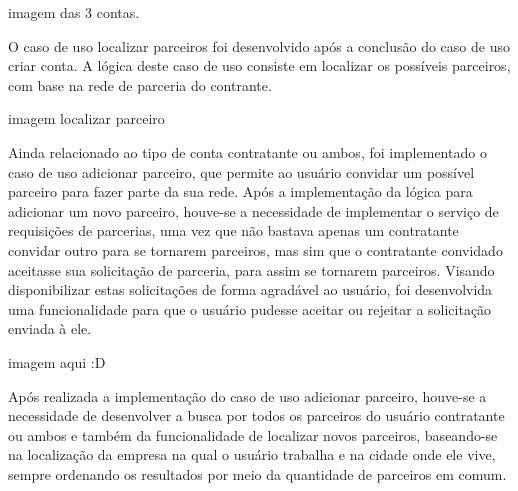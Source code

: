 imagem das 3 contas.

\par O caso de uso localizar parceiros foi desenvolvido após a conclusão do caso de uso criar conta. A lógica deste caso de uso consiste em localizar os possíveis parceiros, com base na rede de parceria do contrante.

imagem localizar parceiro



\par Ainda relacionado ao tipo de conta contratante ou ambos, foi implementado o caso de uso adicionar parceiro, que permite ao usuário convidar um possível parceiro para fazer parte da sua rede. Após a implementação da lógica para adicionar um novo parceiro, houve-se a necessidade de implementar o serviço de requisições de parcerias, uma vez que não bastava apenas um contratante convidar outro para se tornarem parceiros, mas sim que o contratante convidado aceitasse sua solicitação de parceria, para assim se tornarem parceiros. Visando disponibilizar estas solicitações de forma agradável ao usuário, foi desenvolvida uma funcionalidade para que o usuário pudesse aceitar ou rejeitar a solicitação enviada à ele.

imagem aqui :D

\par Após realizada a implementação do caso de uso adicionar parceiro, houve-se a necessidade de desenvolver a busca por todos os parceiros do usuário contratante ou ambos e também da funcionalidade de localizar novos parceiros, baseando-se na localização da empresa na qual o usuário trabalha e na cidade onde ele vive, sempre ordenando os resultados por meio da quantidade de parceiros em comum. 

 

 






